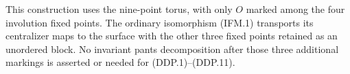 This construction uses the nine-point torus, with only $O$ marked
among the four involution fixed points.  The ordinary isomorphism
(IFM.1) transports its centralizer maps to the surface with the other
three fixed points retained as an unordered block.  No invariant
pants decomposition after those three additional markings is asserted
or needed for (DDP.1)--(DDP.11).
